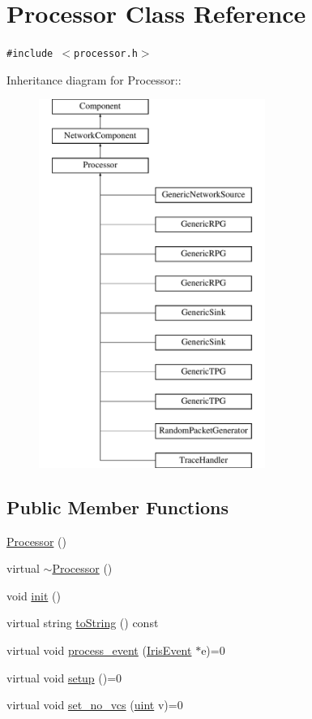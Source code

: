 \hypertarget{classProcessor}{
\section{Processor Class Reference}
\label{classProcessor}
}
{\tt \#include $<$processor.h$>$}

Inheritance diagram for Processor::\begin{figure}[H]
\begin{center}
\leavevmode
\includegraphics[height=12cm]{classProcessor}
\end{center}
\end{figure}
\subsection*{Public Member Functions}
\begin{CompactItemize}
\item 
\hyperlink{classProcessor_50c89dbf76a073f4fb491628258cf292}{Processor} ()
\item 
virtual \hyperlink{classProcessor_cf37952c5b420d4e903a512571678692}{$\sim$Processor} ()
\item 
void \hyperlink{classProcessor_22e869ee49d974ad0ee7ee81961ab88f}{init} ()
\item 
virtual string \hyperlink{classProcessor_d3bdbedfbb00b05f61504e411a418106}{toString} () const 
\item 
virtual void \hyperlink{classProcessor_18cdeefafbd8225cb3ad18dd098c0e08}{process\_\-event} (\hyperlink{classIrisEvent}{IrisEvent} $\ast$e)=0
\item 
virtual void \hyperlink{classProcessor_495fad01358e2d9760c526d6e2db53ea}{setup} ()=0
\item 
virtual void \hyperlink{classProcessor_3280abfe3637712e09cc651b2d09732e}{set\_\-no\_\-vcs} (\hyperlink{outputBuffer_8h_91ad9478d81a7aaf2593e8d9c3d06a14}{uint} v)=0
\end{CompactItemize}
